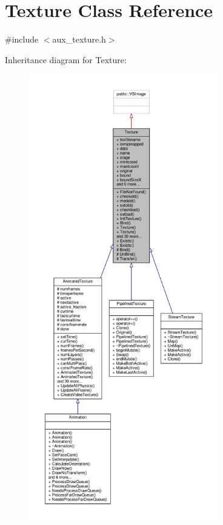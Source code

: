 \hypertarget{classTexture}{}\section{Texture Class Reference}
\label{classTexture}


{\ttfamily \#include $<$aux\+\_\+texture.\+h$>$}



Inheritance diagram for Texture\+:
\nopagebreak
\begin{figure}[H]
\begin{center}
\leavevmode
\includegraphics[height=550pt]{d2/d3e/classTexture__inherit__graph}
\end{center}
\end{figure}


